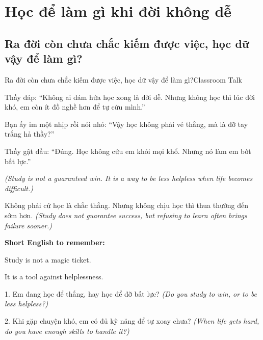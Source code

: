 \chapter{Học để làm gì khi đời không dễ}

\section{Ra đời còn chưa chắc kiếm được việc, học dữ vậy để làm gì?}
\begin{truyen}{Ra đời còn chưa chắc kiếm được việc, học dữ vậy để làm gì?}{Classroom Talk}

Thầy đáp: ``Không ai dám hứa học xong là đời dễ. Nhưng không học thì lúc đời khó, em còn ít đồ nghề hơn để tự cứu mình.''

Bạn ấy im một nhịp rồi nói nhỏ: ``Vậy học không phải vé thắng, mà là đỡ tay trắng hả thầy?''

Thầy gật đầu: ``Đúng. Học không cứu em khỏi mọi khổ. Nhưng nó làm em bớt bất lực.''

\textit{(Study is not a guaranteed win. It is a way to be less helpless when life becomes difficult.)}
\end{truyen}

\begin{baihoc}
Không phải cứ học là chắc thắng. Nhưng không chịu học thì thua thường đến sớm hơn.
\textit{(Study does not guarantee success, but refusing to learn often brings failure sooner.)}
\end{baihoc}

\begin{ghinhoanh}
\textbf{Short English to remember:}

Study is not a magic ticket.

It is a tool against helplessness.
\end{ghinhoanh}

\begin{tuhocnhanh}
1. Em đang học để thắng, hay học để đỡ bất lực? \textit{(Do you study to win, or to be less helpless?)}

2. Khi gặp chuyện khó, em có đủ kỹ năng để tự xoay chưa? \textit{(When life gets hard, do you have enough skills to handle it?)}
\end{tuhocnhanh}
\ngancach

